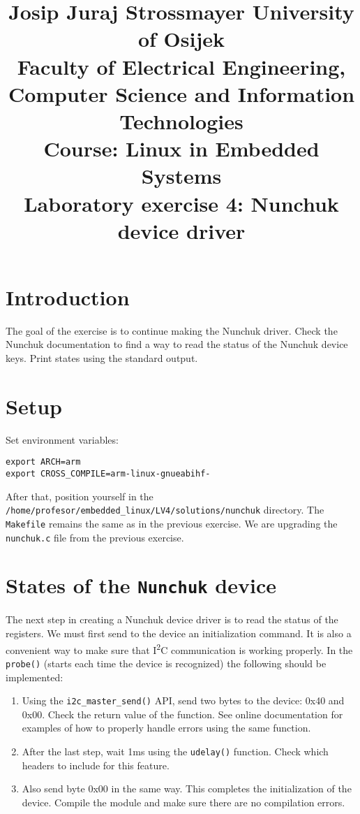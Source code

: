 \documentclass[11pt]{article}
\title{
	\Large Josip Juraj Strossmayer University of Osijek \\
	Faculty of Electrical Engineering, Computer Science and Information
	 Technologies\\
	\vspace{4cm}
	\Large Course: Linux in Embedded Systems \\
	\vspace{4cm}
	\Large \textbf{Laboratory exercise 4: Nunchuk device driver}
	}
\date{}
\begin{document}
\maketitle
\thispagestyle{empty}
\newpage

\section{Introduction}
The goal of the exercise is to continue making the Nunchuk driver.
Check the Nunchuk documentation to find a way to read the status of the Nunchuk
device keys. Print states using the standard output.

\section{Setup}
Set environment variables:
\begin{lstlisting}
export ARCH=arm
export CROSS_COMPILE=arm-linux-gnueabihf-
\end{lstlisting}
After that, position yourself in the
\texttt{/home/profesor/embedded\_linux/LV4/solutions/nunchuk} directory. The
\texttt{Makefile} remains the same as in the previous exercise. We are upgrading
the \texttt{nunchuk.c} file from the previous exercise.

\section{States of the \texttt{Nunchuk} device}
The next step in creating a Nunchuk device driver is to read the status of the
registers. We must first send to the device an initialization command. It is
also a convenient way to make sure that I\textsuperscript{2}C communication is
working properly.
\newline
\newline
In the \texttt{probe()} (starts each time the device is recognized) the
following should be implemented:
\begin{enumerate}
	\item Using the \texttt{i2c\_master\_send()} API, send two bytes to the
		device: 0x40 and 0x00. Check the return value of the function. See
		online documentation for examples of how to properly handle errors using
		the same function.
	\item After the last step, wait 1ms using the \texttt{udelay()} function.
		Check which headers to include for this feature.
	\item Also send byte 0x00 in the same way. This completes the initialization
		of the device.
Compile the module and make sure there are no compilation errors.
\end{enumerate}
\end{document}
